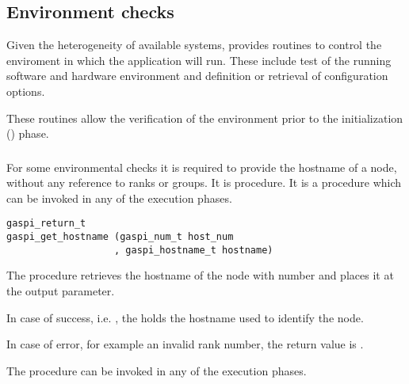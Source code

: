 \subsection{Environment checks}
\label{sec:EnvChecks}

Given the heterogeneity of available systems, \GASPI{} provides
routines to control the enviroment in which the application will
run. These include test of the running software and hardware
environment and definition or retrieval of configuration options.

These routines allow the verification of the environment prior to the
initialization () phase.

\subsubsection{}

For some environmental checks it is required to provide the hostname
of a node, without any reference to ranks or groups. It is
  procedure.
It is a procedure
which can be invoked in any of the \GASPI{} execution phases.

\begin{FDef}
\begin{FDefSign}
\begin{verbatim}
gaspi_return_t
gaspi_get_hostname (gaspi_num_t host_num
                   , gaspi_hostname_t hostname)
\end{verbatim}
\end{FDefSign}
\parameterlistbegin
{}
\parameterlistend
\FStdRetDescNOTimeout
\end{FDef}

The procedure  retrieves the hostname of
the node with number  and places it at
the  output parameter.

In case of success, i.e. \GASPISUCC{}, the  holds
the hostname used to identify the node.

In case of error, for example an invalid rank number, the return value
is \GASPIGERR{}.

The procedure can be invoked in any of the \GASPI{} execution phases.

\subsubsection{}

